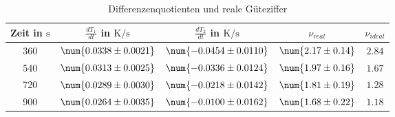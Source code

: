 \begin{table}
 \centering
 \begin{tabular}{S S S S S }
 \toprule
{Zeit in $\si{\second}$} & {$\frac{dT_1}{dt}$ in $\si{\kelvin \per \second}$} & {$\frac{dT_2}{dt}$ in $\si{\kelvin \per \second}$} & {$\nu_{real}$}& {$\nu_{ideal}$} \\
\midrule

360 & $\num{ 0.0338 \pm 0.0021 }$ & $\num{ -0.0454 \pm 0.0110 }$ & $\num{ 2.17 \pm 0.14 }$ & $\num{ 2.84 }$\\

540 & $\num{ 0.0313 \pm 0.0025 }$ & $\num{ -0.0336 \pm 0.0124 }$ & $\num{ 1.97 \pm 0.16 }$ & $\num{ 1.67 }$\\

720 & $\num{ 0.0289 \pm 0.0030 }$ & $\num{ -0.0218 \pm 0.0142 }$ & $\num{ 1.81 \pm 0.19 }$ & $\num{ 1.28 }$\\

900 & $\num{ 0.0264 \pm 0.0035 }$ & $\num{ -0.0100 \pm 0.0162 }$ & $\num{ 1.68 \pm 0.22 }$ & $\num{ 1.18 }$\\

\bottomrule
 \end{tabular}
 \caption{Differenzenquotienten und reale Güteziffer}
 \label{tab: dTdt}
  \end{table}
